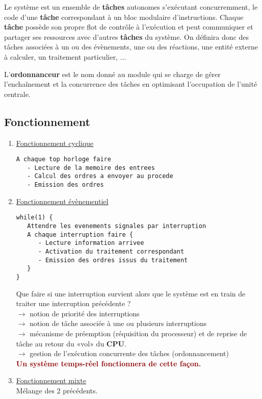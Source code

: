 \documentclass{article}
\newcommand{\dred}[1]{\textcolor{darkred}{\textbf{#1}}}
\begin{document}
Le système est un ensemble de \textbf{tâches} autonomes s'exécutant concurremment, le code d'une
\textbf{tâche} correspondant à un bloc modulaire d'instructions. Chaque \textbf{tâche} possède son propre 
flot de contrôle à l'exécution et peut communiquer et partager ses ressources avec d'autres \textbf{tâches} 
du système. On définira donc des tâches associées à un ou des évènements, une ou des réactions, une entité
externe à calculer, un traitement particulier, ...

L'\textbf{ordonnanceur} est le nom donné au module qui se charge de gérer l'enchaînement et la concurrence
des tâches en optimisant l'occupation de l'unité centrale.

\subsection{Fonctionnement}

\begin{enumerate}
\item \underline{Fonctionnement cyclique}
\begin{lstlisting}
A chaque top horloge faire
   - Lecture de la memoire des entrees
   - Calcul des ordres a envoyer au procede
   - Emission des ordres
\end{lstlisting}

\item \underline{Fonctionnement évènementiel}

\begin{lstlisting}
while(1) {
   Attendre les evenements signales par interruption
   A chaque interruption faire {
      - Lecture information arrivee
      - Activation du traitement correspondant
      - Emission des ordres issus du traitement
   }
}
\end{lstlisting}

Que faire si une interruption survient alors que le système est en train de traiter une interruption 
précédente ? \\
$\rightarrow$ notion de priorité des interruptions \\
$\rightarrow$ notion de tâche associée à une ou plusieurs interruptions \\
$\rightarrow$ mécanisme de préemption (réquisition du processeur) et de reprise de tâche au retour du «vol»
du \textbf{CPU}. \\
$\rightarrow$ gestion de l'exécution concurrente des tâches (ordonnancement) \\

\dred{Un système temps-réel fonctionnera de cette façon.}

\item \underline{Fonctionnement mixte} \\
Mélange des 2 précédents.
\end{enumerate}
\end{document}
